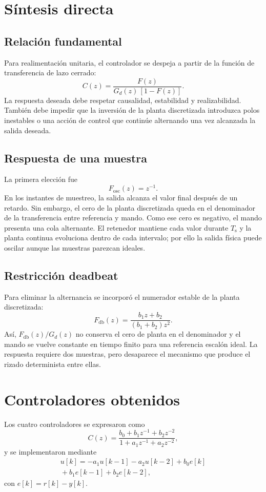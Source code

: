 \documentclass[10pt,twocolumn]{article}
\newcommand{\Ts}{T_{\mathrm{s}}}
\begin{document}
\section{Síntesis directa}
\subsection{Relación fundamental}
Para realimentación unitaria, el controlador se despeja a partir de la función de transferencia de lazo cerrado:
\begin{equation}
C(z)=\frac{F(z)}{G_d(z)\,[1-F(z)]}.
\end{equation}
La respuesta deseada debe respetar causalidad, estabilidad y realizabilidad. También debe impedir que la inversión de la planta discretizada introduzca polos inestables o una acción de control que continúe alternando una vez alcanzada la salida deseada.

\subsection{Respuesta de una muestra}
La primera elección fue
\begin{equation}
F_{\mathrm{osc}}(z)=z^{-1}.
\end{equation}
En los instantes de muestreo, la salida alcanza el valor final después de un retardo. Sin embargo, el cero de la planta discretizada queda en el denominador de la transferencia entre referencia y mando. Como ese cero es negativo, el mando presenta una cola alternante. El retenedor mantiene cada valor durante \(\Ts\) y la planta continua evoluciona dentro de cada intervalo; por ello la salida física puede oscilar aunque las muestras parezcan ideales.

\subsection{Restricción deadbeat}
Para eliminar la alternancia se incorporó el numerador estable de la planta discretizada:
\begin{equation}
F_{\mathrm{db}}(z)=\frac{b_1z+b_2}{(b_1+b_2)z^2}.
\end{equation}
Así, \(F_{\mathrm{db}}(z)/G_d(z)\) no conserva el cero de planta en el denominador y el mando se vuelve constante en tiempo finito para una referencia escalón ideal. La respuesta requiere dos muestras, pero desaparece el mecanismo que produce el rizado determinista entre ellas.

\section{Controladores obtenidos}
Los cuatro controladores se expresaron como
\begin{equation}
C(z)=\frac{b_0+b_1z^{-1}+b_2z^{-2}}{1+a_1z^{-1}+a_2z^{-2}},
\end{equation}
y se implementaron mediante
\begin{multline}
u[k]=-a_1u[k-1]-a_2u[k-2]+b_0e[k]\\
{}+b_1e[k-1]+b_2e[k-2],
\end{multline}
con \(e[k]=r[k]-y[k]\).
\end{document}
